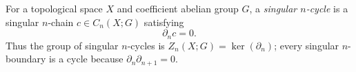 
For a topological space $X$ and coefficient abelian group $G$, a \emph{singular $n$-cycle} is a singular $n$-chain $c\in C_n(X;G)$ satisfying
\[
\partial_n c=0.
\]
Thus the group of singular $n$-cycles is $Z_n(X;G)=\ker(\partial_n)$; every singular $n$-boundary is a cycle because $\partial_n\partial_{n+1}=0$.
